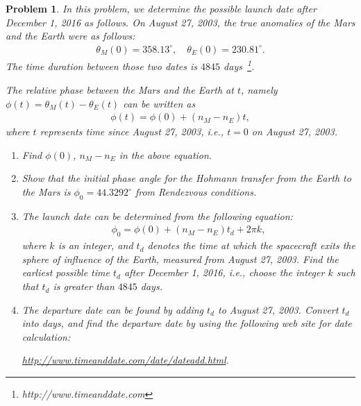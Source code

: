 \documentclass[10pt]{article}
\theoremstyle{plain}\theorembodyfont{\normalfont}
\newtheorem{prob}{Problem}[section]
\newenvironment{subprob}%
{\renewcommand{\theenumi}{\alph{enumi}}\renewcommand{\labelenumi}{(\theenumi)}\begin{enumerate}}%
{\end{enumerate}}%
\begin{document}
\begin{prob}
In this problem, we determine the possible launch date after December 1, 2016 as follows. On August 27, 2003, the true anomalies of the Mars and the Earth were as follows:
\begin{align*}
\theta_M(0) = 358.13^\circ,\quad \theta_E(0)=230.81^\circ.
\end{align*}
The time duration between those two dates is $4845$ days~\footnote{http://www.timeanddate.com}.

The relative phase between the Mars and the Earth at $t$, namely $\phi(t)=\theta_M(t)-\theta_E(t)$ can be written as
\begin{align*}
\phi(t) = \phi(0) + (n_M - n_E) t,
\end{align*}
where $t$ represents time since August 27, 2003, i.e., $t=0$ on August 27, 2003.

\begin{subprob}
\item Find $\phi(0)$, $n_M-n_E$ in the above equation.
\item Show that the initial phase angle for the Hohmann transfer from the Earth to the Mars is $\phi_0=44.3292^\circ$ from Rendezvous conditions.
\item The launch date can be determined from the following equation:
\begin{align*}
\phi_0 = \phi(0) + (n_M - n_E) t_d + 2\pi k,
\end{align*}
where $k$ is an integer, and $t_d$ denotes the time at which the spacecraft exits the sphere of influence of the Earth, measured from August 27, 2003.  Find the earliest possible time $t_d$ after December 1, 2016, i.e., choose the integer $k$ such that $t_d$ is greater than $4845$ days.

\item The departure date can be found by adding $t_d$ to August 27, 2003. Convert $t_d$ into days, and find the departure date by using the following web site for date calculation: 

\url{http://www.timeanddate.com/date/dateadd.html}.

\end{subprob}
\end{prob}
\end{document}
